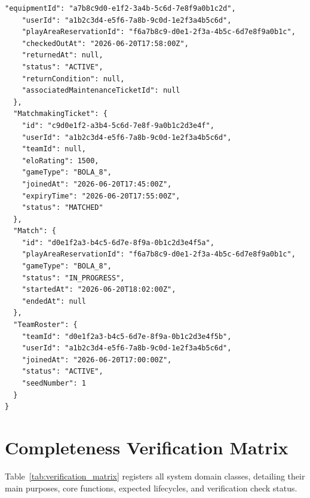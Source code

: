 \documentclass[11pt,a4paper]{report}
\begin{document}
\begin{lstlisting}[caption={Bola 8 Conceptual JSON Instance}]
    "equipmentId": "a7b8c9d0-e1f2-3a4b-5c6d-7e8f9a0b1c2d",
    "userId": "a1b2c3d4-e5f6-7a8b-9c0d-1e2f3a4b5c6d",
    "playAreaReservationId": "f6a7b8c9-d0e1-2f3a-4b5c-6d7e8f9a0b1c",
    "checkedOutAt": "2026-06-20T17:58:00Z",
    "returnedAt": null,
    "status": "ACTIVE",
    "returnCondition": null,
    "associatedMaintenanceTicketId": null
  },
  "MatchmakingTicket": {
    "id": "c9d0e1f2-a3b4-5c6d-7e8f-9a0b1c2d3e4f",
    "userId": "a1b2c3d4-e5f6-7a8b-9c0d-1e2f3a4b5c6d",
    "teamId": null,
    "eloRating": 1500,
    "gameType": "BOLA_8",
    "joinedAt": "2026-06-20T17:45:00Z",
    "expiryTime": "2026-06-20T17:55:00Z",
    "status": "MATCHED"
  },
  "Match": {
    "id": "d0e1f2a3-b4c5-6d7e-8f9a-0b1c2d3e4f5a",
    "playAreaReservationId": "f6a7b8c9-d0e1-2f3a-4b5c-6d7e8f9a0b1c",
    "gameType": "BOLA_8",
    "status": "IN_PROGRESS",
    "startedAt": "2026-06-20T18:02:00Z",
    "endedAt": null
  },
  "TeamRoster": {
    "teamId": "d0e1f2a3-b4c5-6d7e-8f9a-0b1c2d3e4f5b",
    "userId": "a1b2c3d4-e5f6-7a8b-9c0d-1e2f3a4b5c6d",
    "joinedAt": "2026-06-20T17:00:00Z",
    "status": "ACTIVE",
    "seedNumber": 1
  }
}
\end{lstlisting}

\section{Completeness Verification Matrix}

Table~\ref{tab:verification_matrix} registers all system domain classes, detailing their main purposes, core functions, expected lifecycles, and verification check status.
\end{document}
